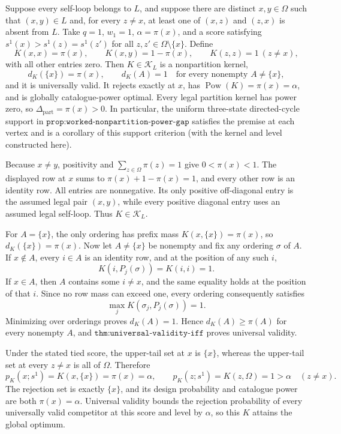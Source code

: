 Suppose every self-loop belongs to \(L\), and suppose there are distinct \(x,y\in\Omega\) such that \((x,y)\in L\) and, for every \(z\neq x\), at least one of \((x,z)\) and \((z,x)\) is absent from \(L\).  Take \(q=1\), \(w_1=1\), \(\alpha=\pi(x)\), and a score satisfying \(s^1(x)>s^1(z)=s^1(z')\) for all \(z,z'\in\Omega\setminus\{x\}\).  Define
\[
 K(x,x)=\pi(x),\qquad K(x,y)=1-\pi(x),\qquad K(z,z)=1\ (z\neq x),
\]
with all other entries zero.  Then \(K\in\mathcal K_L\) is a nonpartition kernel,
\[
 d_K(\{x\})=\pi(x),
 \qquad
 d_K(A)=1\quad\text{for every nonempty }A\neq\{x\},
\]
and it is universally valid.  It rejects exactly at \(x\), has \(\operatorname{Pow}(K)=\pi(x)=\alpha\), and is globally catalogue-power optimal.  Every legal partition kernel has power zero, so \(\Delta_{\mathrm{part}}=\pi(x)>0\).  In particular, the uniform three-state directed-cycle support in \(\texttt{prop:worked-nonpartition-power-gap}\) satisfies the premise at each vertex and is a corollary of this support criterion (with the kernel and level constructed here).

Because \(x\neq y\), positivity and \(\sum_{z\in\Omega}\pi(z)=1\) give \(0<\pi(x)<1\).  The displayed row at \(x\) sums to \(\pi(x)+1-\pi(x)=1\), and every other row is an identity row.  All entries are nonnegative.  Its only positive off-diagonal entry is the assumed legal pair \((x,y)\), while every positive diagonal entry uses an assumed legal self-loop.  Thus \(K\in\mathcal K_L\).

For \(A=\{x\}\), the only ordering has prefix mass \(K(x,\{x\})=\pi(x)\), so \(d_K(\{x\})=\pi(x)\).  Now let \(A\neq\{x\}\) be nonempty and fix any ordering \(\sigma\) of \(A\).  If \(x\notin A\), every \(i\in A\) is an identity row, and at the position of any such \(i\),
\[
 K(i,P_j(\sigma))=K(i,i)=1.
\]
If \(x\in A\), then \(A\) contains some \(i\neq x\), and the same equality holds at the position of that \(i\).  Since no row mass can exceed one, every ordering consequently satisfies
\[
 \max_j K(\sigma_j,P_j(\sigma))=1.
\]
Minimizing over orderings proves \(d_K(A)=1\).  Hence \(d_K(A)\geq\pi(A)\) for every nonempty \(A\), and \(\texttt{thm:universal-validity-iff}\) proves universal validity.

Under the stated tied score, the upper-tail set at \(x\) is \(\{x\}\), whereas the upper-tail set at every \(z\neq x\) is all of \(\Omega\).  Therefore
\[
 p_K(x;s^1)=K(x,\{x\})=\pi(x)=\alpha,
 \qquad
 p_K(z;s^1)=K(z,\Omega)=1>\alpha\quad(z\neq x).
\]
The rejection set is exactly \(\{x\}\), and its design probability and catalogue power are both \(\pi(x)=\alpha\).  Universal validity bounds the rejection probability of every universally valid competitor at this score and level by \(\alpha\), so this \(K\) attains the global optimum.

